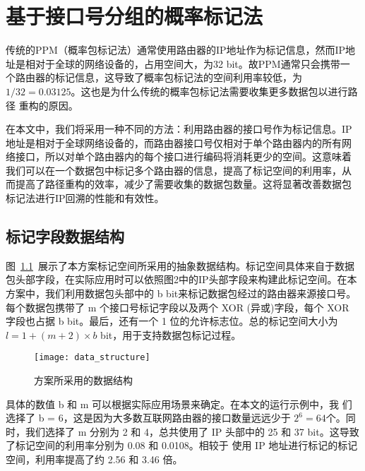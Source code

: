 \chapter{基于接口号分组的概率标记法}
\label{cha:IGPPM}

传统的PPM（概率包标记法）通常使用路由器的IP地址作为标记信息，然而IP地
址是相对于全球的网络设备的，占用空间大，为32 bit。故PPM通常只会携带一
个路由器的标记信息，这导致了概率包标记法的空间利用率较低，为$1/32 = 
0.03125$。这也是为什么传统的概率包标记法需要收集更多数据包以进行路径
重构的原因。

在本文中，我们将采用一种不同的方法：利用路由器的接口号作为标记信息。IP
地址是相对于全球网络设备的，而路由器接口号仅相对于单个路由器内的所有网
络接口，所以对单个路由器内的每个接口进行编码将消耗更少的空间。这意味着
我们可以在一个数据包中标记多个路由器的信息，提高了标记空间的利用率，从
而提高了路径重构的效率，减少了需要收集的数据包数量。这将显著改善数据包
标记法进行IP回溯的性能和有效性。

\section{标记字段数据结构}

图~\ref{fig:data_structure}~展示了本方案标记空间所采用的抽象数据结构。标记空间具体来自于数据包头部字段，在实际应用时可以依照图2中的IP头部字段来构建此标记空间。在本方案中，我们利用数据包头部中的 b bit来标记数据包经过的路由器来源接口号。每个数据包携带了 m 个接口号标记字段以及两个 XOR (异或)字段，每个 XOR 字段也占据 b bit。最后，还有一个 1 位的允许标志位。总的标记空间大小为 $l = 1 + (m + 2) \times b$ bit，用于支持数据包标记过程。
\begin{figure}[htbp]
  \centering
  \texttt{[image: data\_structure]}
  \caption{方案所采用的数据结构}
  \label{fig:data_structure}
\end{figure} 

具体的数值 b 和 m 可以根据实际应用场景来确定。在本文的运行示例中，我
们选择了 b = 6，这是因为大多数互联网路由器的接口数量远远少于 $2^6 =
64$个。同时，我们选择了 m 分别为 2 和 4，总共使用了 IP 头部中的 25
和 37 bit。这导致了标记空间的利用率分别为 0.08 和 0.0108。相较于
使用 IP 地址进行标记的标记空间，利用率提高了约 2.56 和 3.46 倍。
% 

